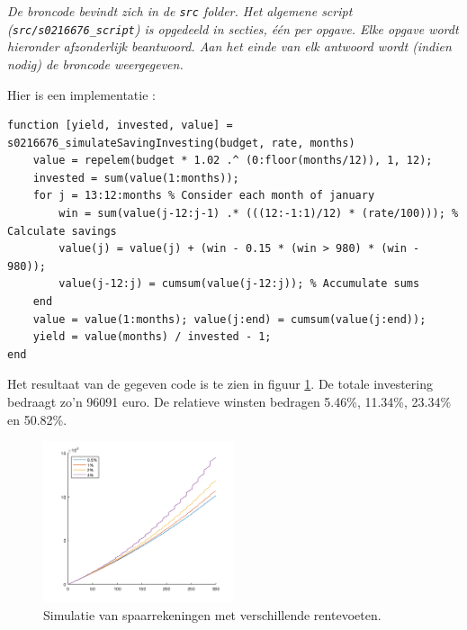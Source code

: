 
\begin{center}
\textit{De broncode bevindt zich in de \texttt{src} folder. Het algemene script (\texttt{src/s0216676\_script}) is opgedeeld in secties, \'e\'en per opgave. Elke opgave wordt hieronder afzonderlijk beantwoord. Aan het einde van elk antwoord wordt (indien nodig) de broncode weergegeven.}
\end{center}



Hier is een implementatie :

\begin{lstlisting}
function [yield, invested, value] = s0216676_simulateSavingInvesting(budget, rate, months)
    value = repelem(budget * 1.02 .^ (0:floor(months/12)), 1, 12); 
    invested = sum(value(1:months));
    for j = 13:12:months % Consider each month of january
    	win = sum(value(j-12:j-1) .* (((12:-1:1)/12) * (rate/100))); % Calculate savings
    	value(j) = value(j) + (win - 0.15 * (win > 980) * (win - 980));
        value(j-12:j) = cumsum(value(j-12:j)); % Accumulate sums
    end
    value = value(1:months); value(j:end) = cumsum(value(j:end));
    yield = value(months) / invested - 1;
end
\end{lstlisting}



Het resultaat van de gegeven code is te zien in figuur \ref{fig:op2}. De totale investering bedraagt zo'n 96091 euro. De relatieve winsten bedragen 5.46\%, 11.34\%, 23.34\% en 50.82\%.

\vspace{0.3cm}
\begin{figure}[h]
\centering
\includegraphics[width=0.5\textwidth]{res/op2.png}
\caption{Simulatie van spaarrekeningen met verschillende rentevoeten.}
\label{fig:op2}
\end{figure}






